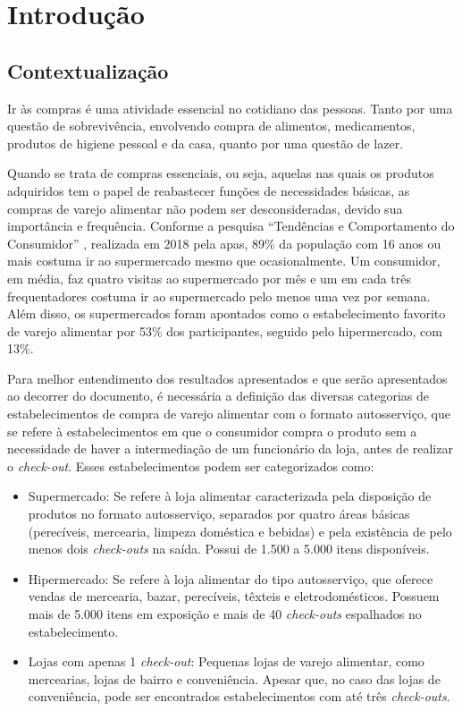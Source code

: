 \chapter{Introdução}

\label{sec:contextualizao}
\section{Contextualização}
Ir às compras é uma atividade essencial no cotidiano das pessoas. Tanto por uma questão de sobrevivência, envolvendo compra de alimentos, medicamentos, produtos de higiene pessoal e da casa, quanto por uma questão de lazer.

Quando se trata de compras essenciais, ou seja, aquelas nas quais os produtos adquiridos tem o papel de reabastecer funções de necessidades básicas, as compras de varejo alimentar não podem ser desconsideradas, devido sua importância e frequência. Conforme a pesquisa “Tendências e Comportamento do Consumidor” \cite{APAS}, realizada em 2018 pela \gls{apas}, 89\% da população com 16 anos ou mais costuma ir ao supermercado mesmo que ocasionalmente. Um consumidor, em média, faz quatro visitas ao supermercado por mês e um em cada três frequentadores costuma ir ao supermercado pelo menos uma vez por semana. Além disso, os supermercados foram apontados como o estabelecimento favorito de varejo alimentar por 53\% dos participantes, seguido pelo hipermercado, com 13\%.

Para melhor entendimento dos resultados apresentados e que serão apresentados ao decorrer do documento, é necessária a definição das diversas categorias de estabelecimentos de compra de varejo alimentar com o formato autosserviço, que se refere à estabelecimentos em que o consumidor compra o produto sem a necessidade de haver a intermediação de um funcionário da loja, antes de realizar o \textit{check-out}. Esses estabelecimentos podem ser categorizados como:
\begin{itemize}
\item Supermercado: Se refere à loja alimentar caracterizada pela disposição de produtos no formato autosserviço, separados por quatro áreas básicas (perecíveis, mercearia, limpeza doméstica e bebidas) e pela existência de pelo menos dois \textit{check-outs} na saída. Possui de 1.500 a 5.000 itens disponíveis.
\item Hipermercado: Se refere à loja alimentar do tipo autosserviço, que oferece vendas de mercearia, bazar, perecíveis, têxteis e eletrodomésticos. Possuem mais de 5.000 itens em exposição e mais de 40 \textit{check-outs} espalhados no estabelecimento.
\item Lojas com apenas 1 \textit{check-out}: Pequenas lojas de varejo alimentar, como mercearias, lojas de bairro e conveniência. Apesar que, no caso das lojas de conveniência, pode ser encontrados estabelecimentos com até três \textit{check-outs}.
\end{itemize}

